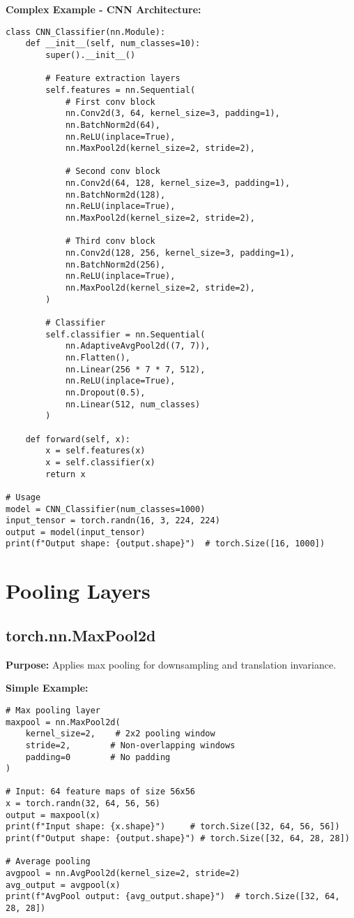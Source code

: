 \documentclass[11pt,a4paper]{book}
\begin{document}
\textbf{Complex Example - CNN Architecture:}
\begin{verbatim}
class CNN_Classifier(nn.Module):
    def __init__(self, num_classes=10):
        super().__init__()
        
        # Feature extraction layers
        self.features = nn.Sequential(
            # First conv block
            nn.Conv2d(3, 64, kernel_size=3, padding=1),
            nn.BatchNorm2d(64),
            nn.ReLU(inplace=True),
            nn.MaxPool2d(kernel_size=2, stride=2),
            
            # Second conv block
            nn.Conv2d(64, 128, kernel_size=3, padding=1),
            nn.BatchNorm2d(128),
            nn.ReLU(inplace=True),
            nn.MaxPool2d(kernel_size=2, stride=2),
            
            # Third conv block
            nn.Conv2d(128, 256, kernel_size=3, padding=1),
            nn.BatchNorm2d(256),
            nn.ReLU(inplace=True),
            nn.MaxPool2d(kernel_size=2, stride=2),
        )
        
        # Classifier
        self.classifier = nn.Sequential(
            nn.AdaptiveAvgPool2d((7, 7)),
            nn.Flatten(),
            nn.Linear(256 * 7 * 7, 512),
            nn.ReLU(inplace=True),
            nn.Dropout(0.5),
            nn.Linear(512, num_classes)
        )
    
    def forward(self, x):
        x = self.features(x)
        x = self.classifier(x)
        return x

# Usage
model = CNN_Classifier(num_classes=1000)
input_tensor = torch.randn(16, 3, 224, 224)
output = model(input_tensor)
print(f"Output shape: {output.shape}")  # torch.Size([16, 1000])
\end{verbatim}

\section{Pooling Layers}

\subsection{torch.nn.MaxPool2d}

\textbf{Purpose:} Applies max pooling for downsampling and translation invariance.

\textbf{Simple Example:}
\begin{verbatim}
# Max pooling layer
maxpool = nn.MaxPool2d(
    kernel_size=2,    # 2x2 pooling window
    stride=2,        # Non-overlapping windows
    padding=0        # No padding
)

# Input: 64 feature maps of size 56x56
x = torch.randn(32, 64, 56, 56)
output = maxpool(x)
print(f"Input shape: {x.shape}")     # torch.Size([32, 64, 56, 56])
print(f"Output shape: {output.shape}") # torch.Size([32, 64, 28, 28])

# Average pooling
avgpool = nn.AvgPool2d(kernel_size=2, stride=2)
avg_output = avgpool(x)
print(f"AvgPool output: {avg_output.shape}")  # torch.Size([32, 64, 28, 28])
\end{verbatim}
\end{document}
